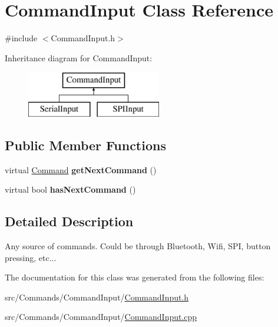 \hypertarget{classCommandInput}{}\section{Command\+Input Class Reference}
\label{classCommandInput}


{\ttfamily \#include $<$Command\+Input.\+h$>$}

Inheritance diagram for Command\+Input\+:\begin{figure}[H]
\begin{center}
\leavevmode
\includegraphics[height=2.000000cm]{classCommandInput}
\end{center}
\end{figure}
\subsection*{Public Member Functions}
\begin{DoxyCompactItemize}
\item 
\hypertarget{classCommandInput_adde08e78426afd0f6b8fd7274c08f289}{}virtual \hyperlink{classCommand}{Command} {\bfseries get\+Next\+Command} ()\label{classCommandInput_adde08e78426afd0f6b8fd7274c08f289}

\item 
\hypertarget{classCommandInput_a2d1a576856c671a36170fa27fe7d083c}{}virtual bool {\bfseries has\+Next\+Command} ()\label{classCommandInput_a2d1a576856c671a36170fa27fe7d083c}

\end{DoxyCompactItemize}


\subsection{Detailed Description}
Any source of commands. Could be through Bluetooth, Wifi, S\+P\+I, button pressing, etc... 

The documentation for this class was generated from the following files\+:\begin{DoxyCompactItemize}
\item 
src/\+Commands/\+Command\+Input/\hyperlink{CommandInput_8h}{Command\+Input.\+h}\item 
src/\+Commands/\+Command\+Input/\hyperlink{CommandInput_8cpp}{Command\+Input.\+cpp}\end{DoxyCompactItemize}
